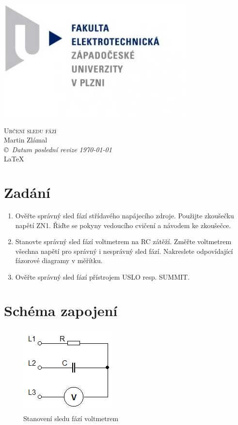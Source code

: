 \documentclass[12pt]{article} %
\begin{document}
\begin{titlepage}
	\includegraphics[scale=0.7]{logo.jpg}
	\vspace*{\fill}
	\begin{center}
		\textsc{\LARGE Určení sledu fází}\\[1cm]
		Martin Zlámal \\[1cm]
		{\small\em \copyright \ Datum poslední revize \today } \\
		\LaTeX
	\end{center}
	\vspace*{\fill}
\end{titlepage}
\newpage

\section{Zadání}
\begin{enumerate}
\item Ověřte správný sled fází střídavého napájecího zdroje. Použijte zkoušečku napětí ZN1. Řiďte se pokyny vedoucího cvičení a návodem ke zkoušečce.
\item Stanovte správný sled fází voltmetrem na RC zátěží. Změřte voltmetrem všechna napětí pro správný i nesprávný sled fází. Nakreslete odpovídající fázorové diagramy v měřítku.
\item Ověřte správný sled fází přístrojem USLO resp. SUMMIT.
\end{enumerate}

\section{Schéma zapojení}
\begin{figure}[H]
\center
\includegraphics[scale=0.8]{schema-v.png}
\caption{Stanovení sledu fází voltmetrem}
\end{figure}
\end{document}
